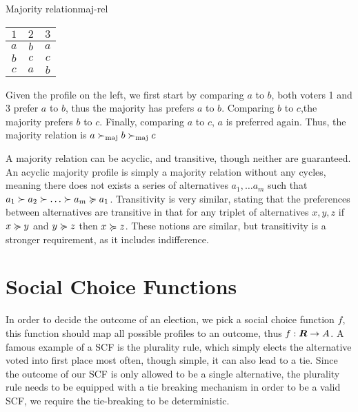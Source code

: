 \begin{example}{Majority relation}{maj-rel}
	\begin{minipage}{0.15\linewidth}
		\begin{tabular}{ccc}
			\toprule
			$1$ & $2$ & $3$ \\
			\midrule
			$a$ & $b$ & $a$ \\
			$b$ & $c$ & $c$ \\
			$c$ & $a$ & $b$ \\
			\bottomrule
		\end{tabular}
	\end{minipage}
	\hspace{0.02\linewidth}
	\begin{minipage}{0.78\linewidth}
		Given the profile on the left, we first start by comparing $a$ to $b$, both voters 1 and 3 prefer $a$ to $b$, thus the majority has prefers $a$ to $b$. Comparing $b$ to $c$,the majority prefers $b$ to $c$. Finally, comparing $a$ to $c$, $a$ is preferred again. Thus, the majority relation is $a \succ_{\textnormal{maj}} b \succ_{\textnormal{maj}} c$
	\end{minipage}
\end{example}

A majority relation can be acyclic, and transitive, though neither are
guaranteed. An acyclic majority profile is simply a majority relation without
any cycles, meaning there does not exists a series of alternatives $a_1, \dots
	a_m$ such that $a_1 \pref a_2 \pref \dots \pref a_m  \prefeq a_1$. Transitivity
is very similar, stating that the preferences between alternatives are
transitive in that for any triplet of alternatives $x,y,z$ if $x \succcurlyeq y$ and
$y \succcurlyeq z$ then $x \succcurlyeq z$. These notions are similar, but transitivity
is a stronger requirement, as it includes indifference.


\section{Social Choice Functions}
\label{sec:SCF}
In order to decide the outcome of an election, we pick a social choice function $f$, this function should map all possible profiles to an outcome, thus $f: \boldsymbol{R} \to A$. A famous example of a SCF is the plurality rule, which simply elects the alternative voted into first place most often, though simple, it can also lead to a tie. Since the outcome of our SCF is only allowed to be a single alternative, the plurality rule needs to be equipped with a tie breaking mechanism in order to be a valid SCF, we require the tie-breaking to be deterministic.


